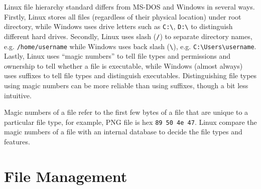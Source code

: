 Linux file hierarchy standard differs from MS-DOS and Windows in several ways. Firstly, Linux stores all files (regardless of their physical location) under root directory, while Windows uses drive letters such as \verb|C:\|, \verb|D:\| to distinguish different hard drives. Secondly, Linux uses slash (\verb|/|) to separate directory names, e.g. \verb|/home/username| while Windows uses back slash (\verb|\|), e.g. \verb|C:\Users\username|. Lastly, Linux uses ``magic numbers'' to tell file types and permissions and ownership to tell whether a file is executable, while Windows (almost always) uses suffixes to tell file types and distinguish executables. Distinguishing file types using magic numbers can be more reliable than using suffixes, though a bit less intuitive.

Magic numbers of a file refer to the first few bytes of a file that are unique to a particular file type, for example, PNG file is hex \verb|89 50 4e 47|. Linux compare the magic numbers of a file with an internal database to decide the file types and features.

\section{File Management} \label{ch4sec:filemanagement}


















